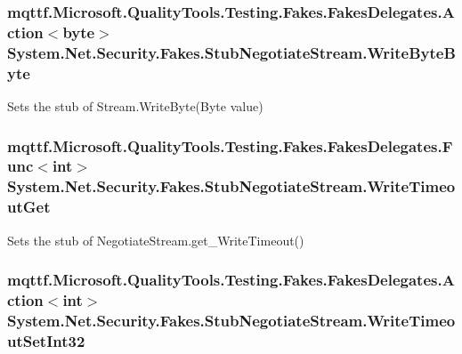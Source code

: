 \hypertarget{class_system_1_1_net_1_1_security_1_1_fakes_1_1_stub_negotiate_stream_a0eeaf0ed3fbbef1790ee4915957128e3}{
\subsubsection[{Write\-Byte\-Byte}]{\setlength{\rightskip}{0pt plus 5cm}mqttf.\-Microsoft.\-Quality\-Tools.\-Testing.\-Fakes.\-Fakes\-Delegates.\-Action$<$byte$>$ System.\-Net.\-Security.\-Fakes.\-Stub\-Negotiate\-Stream.\-Write\-Byte\-Byte}}\label{class_system_1_1_net_1_1_security_1_1_fakes_1_1_stub_negotiate_stream_a0eeaf0ed3fbbef1790ee4915957128e3}


Sets the stub of Stream.\-Write\-Byte(\-Byte value)

\hypertarget{class_system_1_1_net_1_1_security_1_1_fakes_1_1_stub_negotiate_stream_a51262d17c9785e3e3c3bb49454a340fd}{
\subsubsection[{Write\-Timeout\-Get}]{\setlength{\rightskip}{0pt plus 5cm}mqttf.\-Microsoft.\-Quality\-Tools.\-Testing.\-Fakes.\-Fakes\-Delegates.\-Func$<$int$>$ System.\-Net.\-Security.\-Fakes.\-Stub\-Negotiate\-Stream.\-Write\-Timeout\-Get}}\label{class_system_1_1_net_1_1_security_1_1_fakes_1_1_stub_negotiate_stream_a51262d17c9785e3e3c3bb49454a340fd}


Sets the stub of Negotiate\-Stream.\-get\-\_\-\-Write\-Timeout()

\hypertarget{class_system_1_1_net_1_1_security_1_1_fakes_1_1_stub_negotiate_stream_a5fb08c9b4b6f896b66b26df2dd0cc5f5}{
\subsubsection[{Write\-Timeout\-Set\-Int32}]{\setlength{\rightskip}{0pt plus 5cm}mqttf.\-Microsoft.\-Quality\-Tools.\-Testing.\-Fakes.\-Fakes\-Delegates.\-Action$<$int$>$ System.\-Net.\-Security.\-Fakes.\-Stub\-Negotiate\-Stream.\-Write\-Timeout\-Set\-Int32}}\label{class_system_1_1_net_1_1_security_1_1_fakes_1_1_stub_negotiate_stream_a5fb08c9b4b6f896b66b26df2dd0cc5f5}


